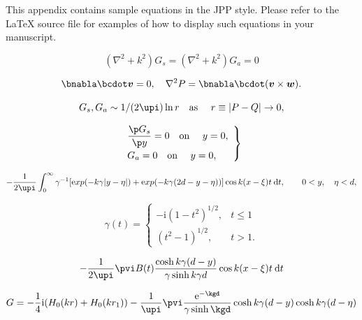 \documentclass{jpp}
\begin{document}
{{\appendix

\section{}\label{appA}
This appendix contains sample equations in the JPP style. Please refer to the {\LaTeX} source file for examples of how to display such equations in your manuscript.

\begin{equation}
  (\nabla^2+k^2)G_s=(\nabla^2+k^2)G_a=0
  \label{Helm}
\end{equation}

\begin{equation}
  \bnabla\bcdot\boldsymbol{v} = 0,\quad \nabla^{2}P=
    \bnabla\bcdot(\boldsymbol{v}\times \boldsymbol{w}).
\end{equation}

\begin{equation}
  G_s,G_a\sim 1 / (2\upi)\ln r
  \quad \mbox{as\ }\quad r\equiv|P-Q|\rightarrow 0,
  \label{singular}
\end{equation}

\begin{equation}
\left. \begin{array}{ll}  
\displaystyle\frac{\p G_s}{\p y}=0
  \quad \mbox{on\ }\quad y=0,\\[8pt]
\displaystyle  G_a=0
  \quad \mbox{on\ }\quad y=0,
 \end{array}\right\}
  \label{symbc}
\end{equation}


\begin{equation}
  -\frac{1}{2\upi} \int_0^{\infty} \gamma^{-1}[\mathrm exp(-k\gamma|y-\eta|)
   + \mathrm exp(-k\gamma(2d-y-\eta))] \cos k(x-\xi)t\:\mathrm{d} t,
   \qquad 0<y,\quad \eta<d,
\end{equation}

\begin{equation}
  \gamma(t) = \left\{
    \begin{array}{ll}
      -\mathrm{i}(1-t^2)^{1/2}, & t\le 1 \\[2pt]
      (t^2-1)^{1/2},         & t>1.
    \end{array} \right.
\end{equation}

\[
  -\frac{1}{2\upi}
   \pvi B(t)\frac{\cosh k\gamma(d-y)}{\gamma\sinh k\gamma d}
   \cos k(x-\xi)t\:\mathrm{d} t
\]

\begin{equation}
  G = -\frac{1}{4}\mathrm{i} (H_0(kr)+H_0(kr_1))
    - \frac{1}{\upi} \pvi\frac{\mathrm{e}^{-\kgd}}%
    {\gamma\sinh\kgd} \cosh k\gamma(d-y) \cosh k\gamma(d-\eta)
\end{equation}

}}
\end{document}
